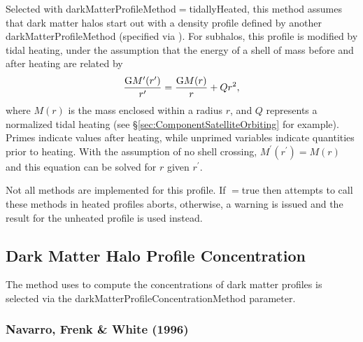Selected with {\normalfont \ttfamily darkMatterProfileMethod}$=${\normalfont \ttfamily tidallyHeated}, this method assumes that dark matter halos start out with a density profile defined by another {\normalfont \ttfamily darkMatterProfileMethod} (specified via {\normalfont \ttfamily [darkMatterProfileTidallyHeatedUnheatedProfile]}). For subhalos, this profile is modified by tidal heating, under the assumption that the energy of a shell of mass before and after heating are related by
\begin{equation}
{ {\mathrm G} M^\prime(r^\prime) \over r^\prime } = { {\mathrm G} M(r) \over r } + Q r^2,
\end{equation}
where $M(r)$ is the mass enclosed within a radius $r$, and $Q$ represents a normalized tidal heating (see \S\ref{sec:ComponentSatelliteOrbiting} for example). Primes indicate values after heating, while unprimed variables indicate quantities prior to heating. With the assumption of no shell crossing, $M^\prime(r^\prime)=M(r)$ and this equation can be solved for $r$ given $r^\prime$.

Not all methods are implemented for this profile. If {\normalfont \ttfamily [darkMatterProfileTidallyHeatedUnimplementedIsFatal]}$=${\normalfont \ttfamily true} then attempts to call these methods in heated profiles aborts, otherwise, a warning is issued and the result for the unheated profile is used instead.

\subsection{Dark Matter Halo Profile Concentration}\label{sec:DarkMatterProfileConcentration}

The method uses to compute the concentrations of dark matter profiles is selected via the {\normalfont \ttfamily darkMatterProfileConcentrationMethod} parameter.

\subsubsection{Navarro, Frenk \& White (1996)}\label{phys:darkMatterProfileConcentration:darkMatterProfileConcentrationNFW1996}


